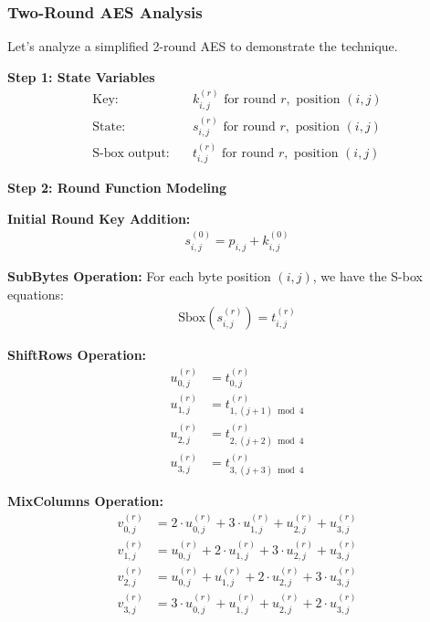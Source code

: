 \documentclass[12pt,a4paper]{article}
\begin{document}
\subsubsection{Two-Round AES Analysis}

Let's analyze a simplified 2-round AES to demonstrate the technique.

\textbf{Step 1: State Variables}
\begin{align}
\text{Key:} \quad & k_{i,j}^{(r)} \text{ for round } r, \text{ position } (i,j) \\
\text{State:} \quad & s_{i,j}^{(r)} \text{ for round } r, \text{ position } (i,j) \\
\text{S-box output:} \quad & t_{i,j}^{(r)} \text{ for round } r, \text{ position } (i,j)
\end{align}

\textbf{Step 2: Round Function Modeling}

\textbf{Initial Round Key Addition:}
\begin{align}
s_{i,j}^{(0)} = p_{i,j} + k_{i,j}^{(0)}
\end{align}

\textbf{SubBytes Operation:}
For each byte position $(i,j)$, we have the S-box equations:
\begin{align}
\text{Sbox}(s_{i,j}^{(r)}) = t_{i,j}^{(r)}
\end{align}

\textbf{ShiftRows Operation:}
\begin{align}
u_{0,j}^{(r)} &= t_{0,j}^{(r)} \\
u_{1,j}^{(r)} &= t_{1,(j+1) \bmod 4}^{(r)} \\
u_{2,j}^{(r)} &= t_{2,(j+2) \bmod 4}^{(r)} \\
u_{3,j}^{(r)} &= t_{3,(j+3) \bmod 4}^{(r)}
\end{align}

\textbf{MixColumns Operation:}
\begin{align}
v_{0,j}^{(r)} &= 2 \cdot u_{0,j}^{(r)} + 3 \cdot u_{1,j}^{(r)} + u_{2,j}^{(r)} + u_{3,j}^{(r)} \\
v_{1,j}^{(r)} &= u_{0,j}^{(r)} + 2 \cdot u_{1,j}^{(r)} + 3 \cdot u_{2,j}^{(r)} + u_{3,j}^{(r)} \\
v_{2,j}^{(r)} &= u_{0,j}^{(r)} + u_{1,j}^{(r)} + 2 \cdot u_{2,j}^{(r)} + 3 \cdot u_{3,j}^{(r)} \\
v_{3,j}^{(r)} &= 3 \cdot u_{0,j}^{(r)} + u_{1,j}^{(r)} + u_{2,j}^{(r)} + 2 \cdot u_{3,j}^{(r)}
\end{align}
\end{document}
